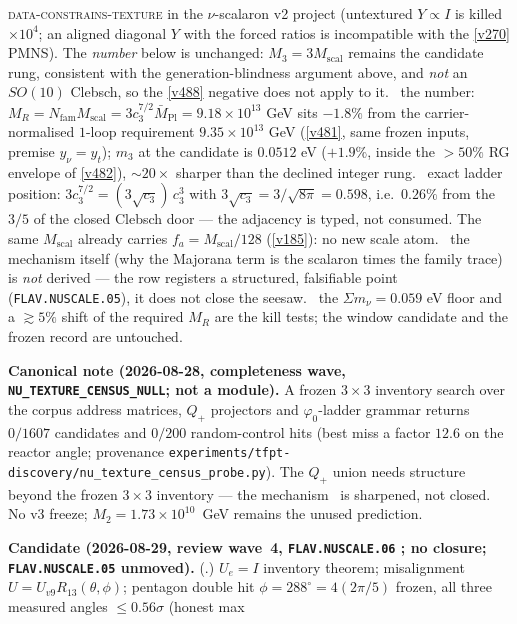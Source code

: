 \documentclass[11pt,a4paper]{article}
\newcommand{\Mbar}{\bar M_{\mathrm{Pl}}}
\newcommand{\Nfam}{N_{\mathrm{fam}}}
\theoremstyle{definition}
\begin{document}
\textsc{data-constrains-texture} in the $\nu$-scalaron v2 project (untextured $Y\propto I$ is
killed $\times10^4$; an aligned diagonal $Y$ with the forced ratios is incompatible with the
\vref{v270} PMNS).  The \emph{number} below is unchanged: $M_3=3M_{\mathrm{scal}}$ remains the
candidate rung, consistent with the generation-blindness argument above, and \emph{not} an
$SO(10)$ Clebsch, so the \vref{v488} negative does not apply to it. \mC\ the number: $M_R=\Nfam
M_{\mathrm{scal}}=3c_3^{7/2}\Mbar=9.18{\times}10^{13}$ GeV sits $-1.8\%$ from the
carrier-normalised $1$-loop requirement $9.35{\times}10^{13}$ GeV (\vref{v481}, same frozen
inputs, premise $y_\nu{=}y_t$); $m_3$ at the candidate is $0.0512$ eV ($+1.9\%$, inside the
$>50\%$ RG envelope of \vref{v482}), ${\sim}20\times$ sharper than the declined integer rung.
\mE\ exact ladder position: $3c_3^{7/2}=(3\sqrt{c_3})\,c_3^3$ with $3\sqrt{c_3}=3/\sqrt{8\pi}
=0.598$, i.e.\ $0.26\%$ from the $3/5$ of the closed Clebsch door --- the adjacency is typed,
not consumed. The same $M_{\mathrm{scal}}$ already carries $f_a=M_{\mathrm{scal}}/128$
(\vref{v185}): no new scale atom. \mO\ the mechanism itself (why the Majorana term is the
scalaron times the family trace) is \emph{not} derived --- the row registers a structured,
falsifiable point (\texttt{FLAV.NUSCALE.05}), it does not close the seesaw. \mX\ the
$\Sigma m_\nu=0.059$ eV floor and a $\gtrsim5\%$ shift of the required $M_R$ are the kill
tests; the window candidate and the frozen record are untouched.
\par\smallskip\noindent\textbf{Canonical note (2026-08-28, completeness wave,
\texttt{NU\_TEXTURE\_CENSUS\_NULL}; not a module).}
A frozen $3\times 3$ inventory search over the corpus address matrices, $Q_+$ projectors and
$\varphi_0$-ladder grammar returns $0/1607$ candidates and $0/200$ random-control hits
(best miss a factor $12.6$ on the reactor angle; provenance
\texttt{experiments/tfpt-discovery/nu\_texture\_census\_probe.py}).  The $Q_+$ union needs
structure beyond the frozen $3\times 3$ inventory --- the mechanism \mO\ is sharpened, not
closed.  No v3 freeze; $M_2=1.73{\times}10^{10}$~GeV remains the unused prediction.
\par\smallskip\noindent\textbf{Candidate (2026-08-29, review wave~4,
\texttt{FLAV.NUSCALE.06} \mC; no closure; \texttt{FLAV.NUSCALE.05} unmoved).}
(.)
$U_e=I$ inventory theorem; misalignment $U=U_{v9}R_{13}(\theta,\phi)$; pentagon double hit
$\phi=288^\circ=4(2\pi/5)$ frozen, all three measured angles $\le0.56\sigma$ (honest max
\end{document}
